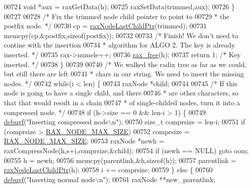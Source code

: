 \begin{DoxyCode}
{{{{{{{{{{{00724             \textcolor{keywordtype}{void} *aux = raxGetData(h);
00725             raxSetData(trimmed,aux);
00726         \}
00727 
00728         \textcolor{comment}{/* Fix the trimmed node child pointer to point to}
00729 \textcolor{comment}{         * the postfix node. */}
00730         cp = \hyperlink{rax_8c_a2c5310b0d00672508a8f935a7109f4ce}{raxNodeLastChildPtr}(trimmed);
00731         memcpy(cp,&postfix,\textcolor{keyword}{sizeof}(postfix));
00732 
00733         \textcolor{comment}{/* Finish! We don't need to contine with the insertion}
00734 \textcolor{comment}{         * algorithm for ALGO 2. The key is already inserted. */}
00735         rax->numele++;
00736         \hyperlink{rax__malloc_8h_a3adfa16bca6cd23b6e125fd441465e49}{rax\_free}(h);
00737         \textcolor{keywordflow}{return} 1; \textcolor{comment}{/* Key inserted. */}
00738     \}
00739 
00740     \textcolor{comment}{/* We walked the radix tree as far as we could, but still there are left}
00741 \textcolor{comment}{     * chars in our string. We need to insert the missing nodes. */}
00742     \textcolor{keywordflow}{while}(i < len) \{
00743         raxNode *child;
00744 
00745         \textcolor{comment}{/* If this node is going to have a single child, and there}
00746 \textcolor{comment}{         * are other characters, so that that would result in a chain}
00747 \textcolor{comment}{         * of single-childed nodes, turn it into a compressed node. */}
00748         \textcolor{keywordflow}{if} (h->size == 0 && len-i > 1) \{
00749             \hyperlink{rax_8c_a10b215c81aa397dbc44adfb3e436befb}{debugf}(\textcolor{stringliteral}{"Inserting compressed node\(\backslash\)n"});
00750             size\_t comprsize = len-i;
00751             \textcolor{keywordflow}{if} (comprsize > \hyperlink{rax_8h_a3b97483d00f37dd12e2d5efa4a9f23ce}{RAX\_NODE\_MAX\_SIZE})
00752                 comprsize = \hyperlink{rax_8h_a3b97483d00f37dd12e2d5efa4a9f23ce}{RAX\_NODE\_MAX\_SIZE};
00753             raxNode *newh = raxCompressNode(h,s+i,comprsize,&child);
00754             \textcolor{keywordflow}{if} (newh == NULL) \textcolor{keywordflow}{goto} oom;
00755             h = newh;
00756             memcpy(parentlink,&h,\textcolor{keyword}{sizeof}(h));
00757             parentlink = \hyperlink{rax_8c_a2c5310b0d00672508a8f935a7109f4ce}{raxNodeLastChildPtr}(h);
00758             i += comprsize;
00759         \} \textcolor{keywordflow}{else} \{
00760             \hyperlink{rax_8c_a10b215c81aa397dbc44adfb3e436befb}{debugf}(\textcolor{stringliteral}{"Inserting normal node\(\backslash\)n"});
00761             raxNode **new\_parentlink;
}}}}}}}}}}}
\end{DoxyCode}
